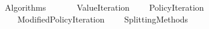 %
\begin{isabellebody}%
%
%
\isadelimtheory
\isanewline
\isanewline
%
\endisadelimtheory
%
\isatagtheory
{}\isamarkupfalse%
\ Algorithms\isanewline
\ \ \isanewline
\ \ \ \ Value{\isacharunderscore}{\kern0pt}Iteration\isanewline
\ \ \ \ Policy{\isacharunderscore}{\kern0pt}Iteration\isanewline
\ \ \ \ Modified{\isacharunderscore}{\kern0pt}Policy{\isacharunderscore}{\kern0pt}Iteration\isanewline
\ \ \ \ Splitting{\isacharunderscore}{\kern0pt}Methods\isanewline
{}\isanewline
{}\isamarkupfalse%
%
\endisatagtheory
{\isafoldtheory}%
%
\isadelimtheory
%
\endisadelimtheory
%
\end{isabellebody}%
\endinput
